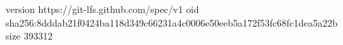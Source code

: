 version https://git-lfs.github.com/spec/v1
oid sha256:8dddab21f0424ba118d349c66231a4c0006e50eeb5a172f53fc68fc1dea5a22b
size 393312
